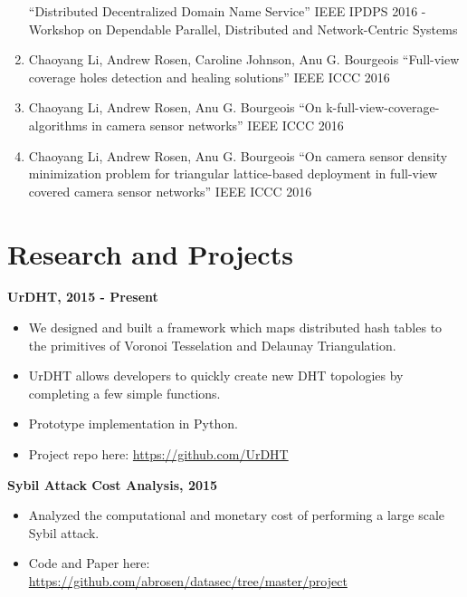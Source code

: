 \documentclass{res}
\begin{document}
\begin{resume}
\begin{enumerate}
	``Distributed Decentralized Domain Name Service''
	IEEE IPDPS 2016 - Workshop on Dependable Parallel, Distributed and Network-Centric Systems
	\item Chaoyang Li, Andrew Rosen, Caroline Johnson, Anu G. Bourgeois 
	``Full-view coverage holes detection and healing solutions''
	IEEE ICCC 2016
	\item Chaoyang Li, Andrew Rosen, Anu G. Bourgeois 
	``On k-full-view-coverage-algorithms in camera sensor networks''
	IEEE ICCC 2016
	\item Chaoyang Li, Andrew Rosen, Anu G. Bourgeois
	``On camera sensor density minimization problem for triangular lattice-based deployment in full-view covered camera sensor networks'' 
	IEEE ICCC 2016
        
    \end{enumerate}
    
    
  
\section{Research and Projects}

{\bf UrDHT, 2015 - Present }
\begin{itemize}
	\item We designed and built a framework which maps distributed hash tables to the primitives of Voronoi Tesselation and Delaunay Triangulation.
	\item UrDHT allows developers to quickly create new DHT topologies by completing a few simple functions. 
	\item Prototype implementation in Python.
	\item Project repo here: \url{https://github.com/UrDHT}
\end{itemize}

{\bf Sybil Attack Cost Analysis, 2015}
\begin{itemize}
	\item Analyzed the computational and monetary cost of performing a large scale Sybil attack.
	\item Code and Paper here: \url{https://github.com/abrosen/datasec/tree/master/project}
\end{itemize}




\end{resume}
\end{document}
